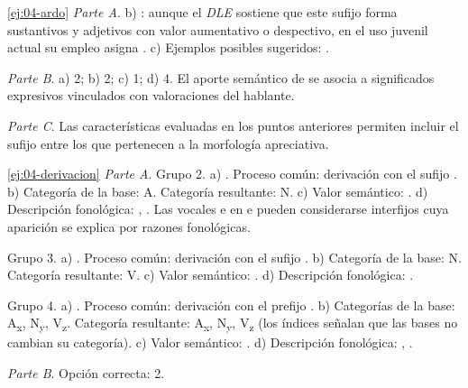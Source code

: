 \begin{solucion}{\ref{ej:04-ardo}}
\textit{Parte A}. b) : aunque el \textit{DLE} sostiene que este
sufijo forma sustantivos y adjetivos con valor aumentativo o despectivo, en el
uso juvenil actual su empleo asigna . c) Ejemplos posibles sugeridos: .

\textit{Parte B}. a) 2; b) 2; c) 1; d) 4. El aporte semántico de  se
asocia a significados expresivos vinculados con valoraciones del hablante.

\textit{Parte C}. Las características evaluadas en los puntos anteriores
permiten incluir el sufijo  entre los que pertenecen a la
morfología apreciativa.
\end{solucion}

\begin{solucion}{\ref{ej:04-derivacion}}
\textit{Parte A}. Grupo 2. a) . Proceso común: derivación con
el sufijo . b) Categoría de la base: A. Categoría resultante: N. c)
Valor semántico: . d) Descripción fonológica:
, . Las vocales  e  en  e
 pueden considerarse interfijos cuya aparición se explica por
razones fonológicas.

Grupo 3. a) . Proceso común:
derivación con el sufijo . b) Categoría de la base: N. Categoría
resultante: V. c) Valor semántico: . d) Descripción fonológica:
.

Grupo 4. a) . Proceso común: derivación con el prefijo . b)
Categorías de la base: A\textsubscript{x}, N\textsubscript{y},
V\textsubscript{z}. Categoría resultante: A\textsubscript{x},
N\textsubscript{y}, V\textsubscript{z} (los índices señalan que las bases no
cambian su categoría). c) Valor semántico: . d) Descripción fonológica: ,
.

\textit{Parte B}. Opción correcta: 2.
\end{solucion}

